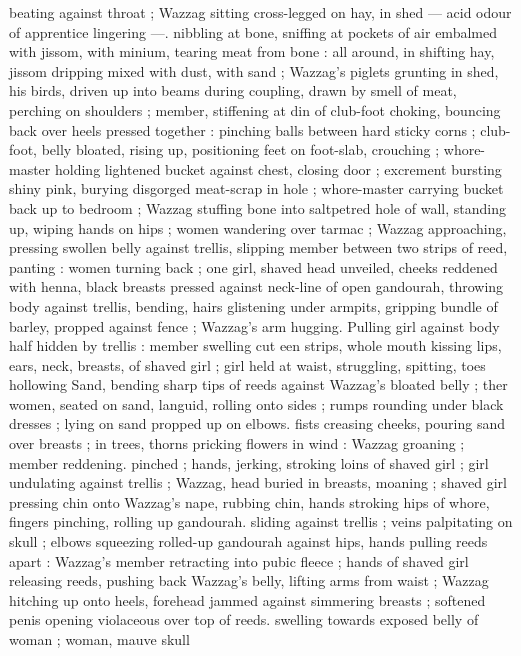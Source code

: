 beating against throat ; Wazzag sitting cross-legged on hay, in shed 
--- acid odour of apprentice lingering ---. nibbling at bone, sniffing 
at pockets of air embalmed with jissom, with minium, tearing meat 
from bone : all around, in shifting hay, jissom dripping mixed with 
dust, with sand ; Wazzag's piglets grunting in shed, his birds, driven 
up into beams during coupling, drawn by smell of meat, perching on 
shoulders ; member, stiffening at din of club-foot choking, bouncing 
back over heels pressed together : pinching balls between hard 
sticky corns ; club-foot, belly bloated, rising up, positioning feet on 
foot-slab, crouching ; whore-master holding lightened bucket against 
chest, closing door ; excrement bursting shiny pink, burying 
disgorged meat-scrap in hole ; whore-master carrying bucket back 
up to bedroom ; Wazzag stuffing bone into saltpetred hole of wall, 
standing up, wiping hands on hips ; women wandering over tarmac ; 
Wazzag approaching, pressing swollen belly against trellis, slipping 
member between two strips of reed, panting : women turning back ; 
one girl, shaved head unveiled, cheeks reddened with henna, black 
breasts pressed against neck-line of open gandourah, throwing body 
against trellis, bending, hairs glistening under armpits, gripping 
bundle of barley, propped against fence ; Wazzag's arm hugging. 
Pulling girl against body half hidden by trellis : member swelling cut 
een strips, whole mouth kissing lips, ears, neck, breasts, of 
shaved girl ; girl held at waist, struggling, spitting, toes hollowing 
Sand, bending sharp tips of reeds against Wazzag's bloated belly ; 
ther women, seated on sand, languid, rolling onto sides ; rumps 
rounding under black dresses ; lying on sand propped up on elbows. 
fists creasing cheeks, pouring sand over breasts ; in trees, thorns 
pricking flowers in wind : Wazzag groaning ; member reddening. 
pinched ; hands, jerking, stroking loins of shaved girl ; girl 
undulating against trellis ; Wazzag, head buried in breasts, moaning 
; shaved girl pressing chin onto Wazzag's nape, rubbing chin, hands 
stroking hips of whore, fingers pinching, rolling up gandourah. 
sliding against trellis ; veins palpitating on skull ; elbows squeezing 
rolled-up gandourah against hips, hands pulling reeds apart : 
Wazzag's member retracting into pubic fleece ; hands of shaved girl 
releasing reeds, pushing back Wazzag's belly, lifting arms from waist 
; Wazzag hitching up onto heels, forehead jammed against simmering 
breasts ; softened penis opening violaceous over top of reeds. 
swelling towards exposed belly of woman ; woman, mauve skull 
